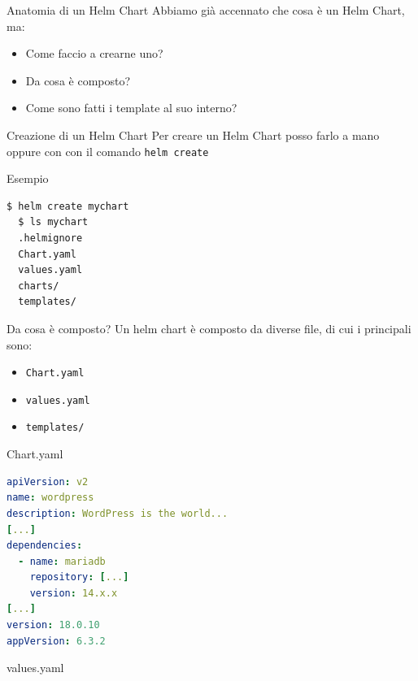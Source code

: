 \documentclass{beamer}
\begin{document}
 \begin{frame}{Anatomia di un Helm Chart}
  Abbiamo già accennato che cosa è un Helm Chart, ma: 
  \begin{itemize}
      \item Come faccio a crearne uno?
      \item Da cosa è composto?
      \item Come sono fatti i template al suo interno?
  \end{itemize}
  \framebreak
  \begin{block}{Creazione di un Helm Chart}
  Per creare un Helm Chart posso farlo a mano oppure con con il comando \lstinline[language=bash]{helm create} 
  \end{block}
  \framebreak
  \begin{block}{Esempio}
  \begin{lstlisting}[backgroundcolor=\color{white},language=bash,basicstyle=\small]
  $ helm create mychart
  $ ls mychart
  .helmignore
  Chart.yaml
  values.yaml
  charts/
  templates/
  \end{lstlisting}
  \end{block}
  \framebreak
  \begin{block}{Da cosa è composto?}
  Un helm chart è composto da diverse file, di cui i principali sono:
  \begin{itemize}
      \item \lstinline[language=bash]{Chart.yaml}
      \item \lstinline[language=bash]{values.yaml}
      \item \lstinline[language=bash]{templates/}
  \end{itemize}
  \end{block}
  \framebreak
  \begin{block}{Chart.yaml}
  \begin{lstlisting}[backgroundcolor=\color{white},language=yaml,basicstyle=\small]
apiVersion: v2
name: wordpress
description: WordPress is the world...
[...]
dependencies:
  - name: mariadb
    repository: [...]
    version: 14.x.x
[...]
version: 18.0.10
appVersion: 6.3.2
  \end{lstlisting}
  \end{block}
  \framebreak
  \begin{block}{values.yaml}
  \begin{lstlisting}[backgroundcolor=\color{white},language=yaml,basicstyle=\tiny]
  

\end{lstlisting}
\end{block}
\end{frame}
\end{document}

